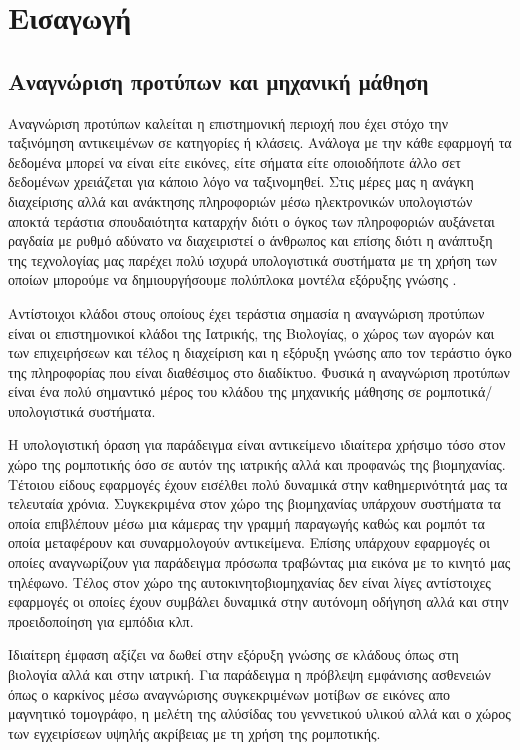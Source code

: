 

\chapter{Εισαγωγή}

\section{Αναγνώριση προτύπων και μηχανική μάθηση}
\par
Αναγνώριση προτύπων καλείται η επιστημονική περιοχή που έχει στόχο την ταξινόμηση αντικειμένων σε κατηγορίες ή κλάσεις. Ανάλογα με την κάθε εφαρμογή τα δεδομένα μπορεί να είναι είτε εικόνες, είτε σήματα είτε οποιοδήποτε άλλο σετ δεδομένων χρειάζεται για κάποιο λόγο να ταξινομηθεί. Στις μέρες μας η ανάγκη διαχείρισης αλλά και ανάκτησης πληροφοριών μέσω ηλεκτρονικών υπολογιστών αποκτά τεράστια σπουδαιότητα καταρχήν διότι ο όγκος των πληροφοριών αυξάνεται ραγδαία με ρυθμό αδύνατο να διαχειριστεί ο άνθρωπος και επίσης διότι η ανάπτυξη της τεχνολογίας μας παρέχει πολύ ισχυρά υπολογιστικά συστήματα με τη χρήση των οποίων μπορούμε να δημιουργήσουμε πολύπλοκα μοντέλα εξόρυξης γνώσης . 
\par
Αντίστοιχοι κλάδοι στους οποίους έχει τεράστια σημασία η αναγνώριση προτύπων είναι οι επιστημονικοί κλάδοι της Ιατρικής, της Βιολογίας, ο χώρος των αγορών και των επιχειρήσεων και τέλος η διαχείριση και η εξόρυξη γνώσης απο τον τεράστιο όγκο της πληροφορίας που είναι διαθέσιμος στο διαδίκτυο. Φυσικά η αναγνώριση προτύπων είναι ένα πολύ σημαντικό μέρος του κλάδου της μηχανικής μάθησης σε ρομποτικά/υπολογιστικά συστήματα.
\par
Η υπολογιστική όραση για παράδειγμα είναι αντικείμενο ιδιαίτερα χρήσιμο τόσο στον χώρο της ρομποτικής όσο σε αυτόν της ιατρικής αλλά και προφανώς της βιομηχανίας. Τέτοιου είδους εφαρμογές έχουν εισέλθει πολύ δυναμικά στην καθημερινότητά μας τα τελευταία χρόνια. Συγκεκριμένα στον χώρο της βιομηχανίας υπάρχουν συστήματα τα οποία επιβλέπουν μέσω μια κάμερας την γραμμή παραγωγής καθώς και ρομπότ τα οποία μεταφέρουν και συναρμολογούν αντικείμενα. Eπίσης υπάρχουν εφαρμογές οι οποίες αναγνωρίζουν για παράδειγμα πρόσωπα τραβώντας μια εικόνα με το κινητό μας τηλέφωνο. Τέλος στον χώρο της αυτοκινητοβιομηχανίας δεν είναι λίγες αντίστοιχες εφαρμογές οι οποίες έχουν συμβάλει δυναμικά στην αυτόνομη οδήγηση αλλά και στην προειδοποίηση για εμπόδια κλπ.
\par
Ιδιαίτερη έμφαση αξίζει να δωθεί στην εξόρυξη γνώσης σε κλάδους όπως στη βιολογία αλλά και στην ιατρική. Για παράδειγμα η πρόβλεψη εμφάνισης ασθενειών όπως ο καρκίνος μέσω αναγνώρισης συγκεκριμένων μοτίβων σε εικόνες απο μαγνητικό τομογράφο, η μελέτη της αλύσίδας του γεννετικού υλικού αλλά και ο χώρος των εγχειρίσεων υψηλής ακρίβειας με τη χρήση της ρομποτικής.

